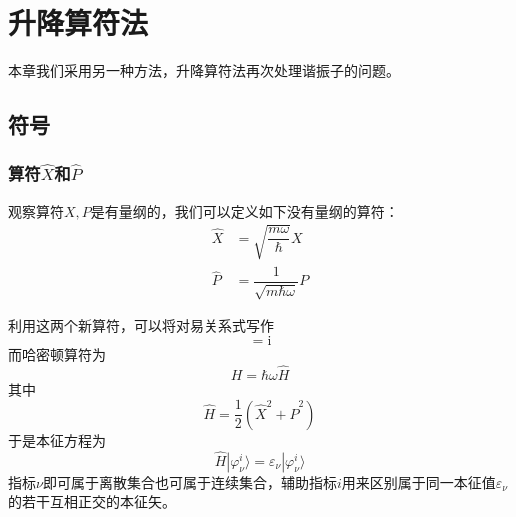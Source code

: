 \documentclass[]{article}
\begin{document}
\section{升降算符法}
本章我们采用另一种方法，升降算符法再次处理谐振子的问题。
\subsection{符号}
\subsubsection{算符$\widehat{X}$和$\widehat{P}$}
观察算符$X,P$是有量纲的，我们可以定义如下没有量纲的算符：
\begin{align}
	\widehat{X}&=\sqrt{\dfrac{m\omega}{\hbar}}X\nonumber\\
	\widehat{P}&=\dfrac{1}{\sqrt{m\hbar\omega}}P
	\label{b1b1}
\end{align}

利用这两个新算符，可以将对易关系式写作
\begin{equation}
	[\widehat{X},\widehat{P}]=\mathrm{i}
\end{equation}
而哈密顿算符为
\begin{equation}
	H=\hbar\omega\widehat{H}
\end{equation}
其中
\begin{equation}
	\widehat{H}=\dfrac{1}{2}(\widehat{X}^2+\widehat{P}^2)
	\label{b4b4}
\end{equation}
于是本征方程为
\begin{equation}
	\widehat{H}|\varphi_\nu^i\rangle=\varepsilon_\nu|\varphi_\nu^i\rangle
	\label{b5b5}
\end{equation}
指标$\nu$即可属于离散集合也可属于连续集合，辅助指标$i$用来区别属于同一本征值$\varepsilon_\nu$的若干互相正交的本征矢。
\end{document}
